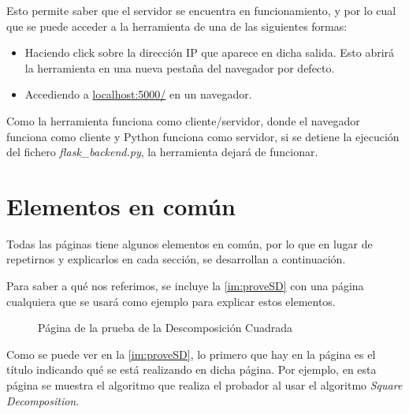 Esto permite saber que el servidor se encuentra en funcionamiento, y por lo cual que se puede acceder a la herramienta de una de las siguientes formas:
\begin{itemize}
    \item Haciendo click sobre la dirección IP que aparece en dicha salida. Esto abrirá la herramienta en una nueva pestaña del navegador por defecto.
    \item Accediendo a \href{localhost:5000/}{localhost:5000/} en un navegador.
\end{itemize}

Como la herramienta funciona como cliente/servidor, donde el navegador funciona como cliente y Python funciona como servidor, si se detiene la ejecución del fichero \emph{flask\_backend.py}, la herramienta dejará de funcionar.

\section*{Elementos en común}

Todas las páginas tiene algunos elementos en común, por lo que en lugar de repetirnos y explicarlos en cada sección, se desarrollan a continuación.

Para saber a qué nos referimos, se incluye la \autoref{im:proveSD} con una página cualquiera que se usará como ejemplo para explicar estos elementos.
\begin{figure}[H]
    \centering
    \caption{Página de la prueba de la Descomposición Cuadrada}
    \label{im:proveSD}
\end{figure}

Como se puede ver en la \autoref{im:proveSD}, lo primero que hay en la página es el título indicando qué se está realizando en dicha página. Por ejemplo, en esta página se muestra el algoritmo que realiza el probador al usar el algoritmo \emph{Square Decomposition}.

